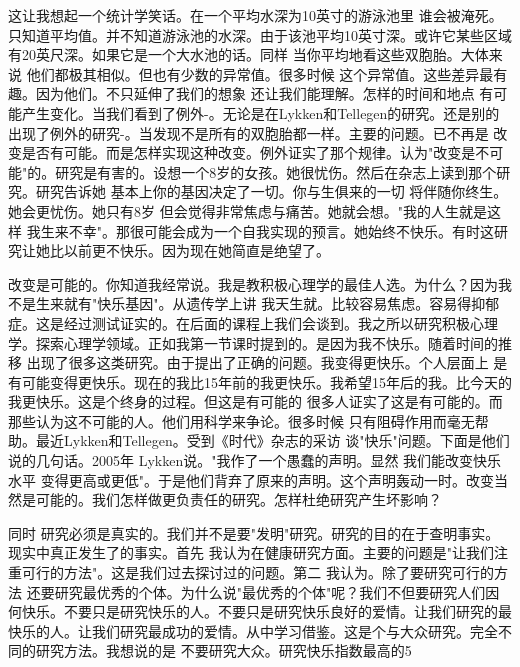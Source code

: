这让我想起一个统计学笑话。在一个平均水深为10英寸的游泳池里 谁会被淹死。只知道平均值。并不知道游泳池的水深。由于该池平均10英寸深。或许它某些区域有20英尺深。如果它是一个大水池的话。同样 当你平均地看这些双胞胎。大体来说 他们都极其相似。但也有少数的异常值。很多时候 这个异常值。这些差异最有趣。因为他们。不只延伸了我们的想象 还让我们能理解。怎样的时间和地点 有可能产生变化。当我们看到了例外-。无论是在Lykken和Tellegen的研究。还是别的出现了例外的研究-。当发现不是所有的双胞胎都一样。主要的问题。已不再是 改变是否有可能。而是怎样实现这种改变。例外证实了那个规律。认为"改变是不可能"的。研究是有害的。设想一个8岁的女孩。她很忧伤。然后在杂志上读到那个研究。研究告诉她 基本上你的基因决定了一切。你与生俱来的一切 将伴随你终生。她会更忧伤。她只有8岁 但会觉得非常焦虑与痛苦。她就会想。"我的人生就是这样 我生来不幸"。那很可能会成为一个自我实现的预言。她始终不快乐。有时这研究让她比以前更不快乐。因为现在她简直是绝望了。 

改变是可能的。你知道我经常说。我是教积极心理学的最佳人选。为什么？因为我不是生来就有"快乐基因"。从遗传学上讲 我天生就。比较容易焦虑。容易得抑郁症。这是经过测试证实的。在后面的课程上我们会谈到。我之所以研究积极心理学。探索心理学领域。正如我第一节课时提到的。是因为我不快乐。随着时间的推移 出现了很多这类研究。由于提出了正确的问题。我变得更快乐。个人层面上 是有可能变得更快乐。现在的我比15年前的我更快乐。我希望15年后的我。比今天的我更快乐。这是个终身的过程。但这是有可能的 很多人证实了这是有可能的。而那些认为这不可能的人。他们用科学来争论。很多时候 只有阻碍作用而毫无帮助。最近Lykken和Tellegen。受到《时代》杂志的采访 谈"快乐"问题。下面是他们说的几句话。2005年 Lykken说。"我作了一个愚蠢的声明。显然 我们能改变快乐水平 变得更高或更低"。于是他们背弃了原来的声明。这个声明轰动一时。改变当然是可能的。我们怎样做更负责任的研究。怎样杜绝研究产生坏影响？ 

同时 研究必须是真实的。我们并不是要"发明"研究。研究的目的在于查明事实。现实中真正发生了的事实。首先 我认为在健康研究方面。主要的问题是"让我们注重可行的方法"。这是我们过去探讨过的问题。第二 我认为。除了要研究可行的方法 还要研究最优秀的个体。为什么说"最优秀的个体"呢？我们不但要研究人们因何快乐。不要只是研究快乐的人。不要只是研究快乐良好的爱情。让我们研究的最快乐的人。让我们研究最成功的爱情。从中学习借鉴。这是个与大众研究。完全不同的研究方法。我想说的是 不要研究大众。研究快乐指数最高的5%

